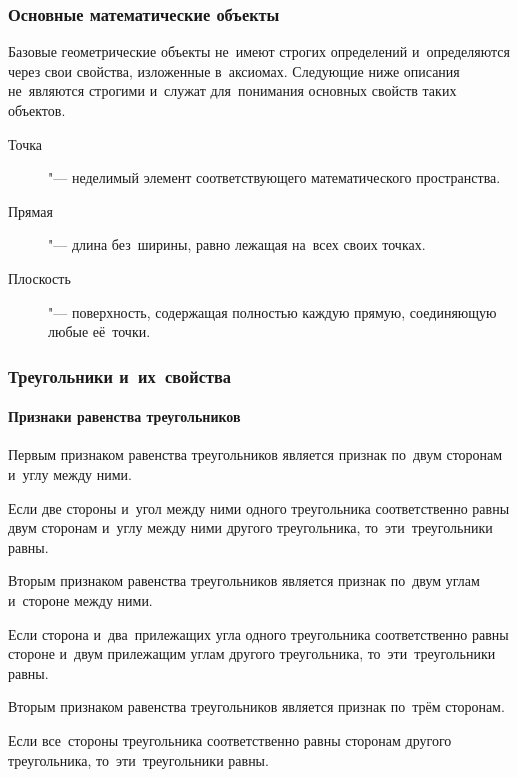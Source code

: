 \documentclass[]{scrartcl}
\begin{document}
\subsubsection{Основные математические объекты}\label{main-figures}
Базовые геометрические объекты не~имеют строгих определений и~определяются через свои свойства, изложенные в~аксиомах. Следующие ниже описания не~являются строгими и~служат для~понимания основных свойств таких объектов.
\begin{description}
	\item[Точка] "--- неделимый элемент соответствующего математического пространства.
\end{description}
\begin{description}
	\item[Прямая] "--- длина без~ширины, равно лежащая на~всех своих точках.
\end{description}
\begin{description}
	\item[Плоскость] "--- поверхность, содержащая полностью каждую прямую, соединяющую любые её~точки.
\end{description}


\subsubsection{Треугольники и~их~свойства}\label{triangles}
\paragraph{Признаки равенства треугольников}
Первым признаком равенства треугольников является признак по~двум сторонам и~углу между ними.
\begin{theorem}
	Если две стороны и~угол между ними одного треугольника соответственно равны двум сторонам и~углу между ними другого треугольника, то~эти~треугольники равны.
\end{theorem}
Вторым признаком равенства треугольников является признак по~двум углам и~стороне между ними.
\begin{theorem}
	Если сторона и~два~прилежащих угла одного треугольника соответственно равны стороне и~двум прилежащим углам другого треугольника, то~эти~треугольники равны.
\end{theorem}
Вторым признаком равенства треугольников является признак по~трём сторонам.
\begin{theorem}
	Если все~стороны треугольника соответственно равны сторонам другого треугольника, то~эти~треугольники равны.
\end{theorem}
\end{document}
